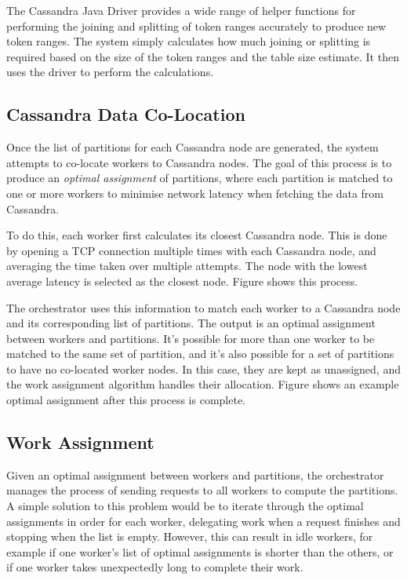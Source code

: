 
The Cassandra Java Driver provides a wide range of helper functions for performing the joining and splitting of token ranges accurately to produce new token ranges. The system simply calculates how much joining or splitting is required based on the size of the token ranges and the table size estimate. It then uses the driver to perform the calculations.

\subsection{Cassandra Data Co-Location}\label{subsec:colocation}
Once the list of partitions for each Cassandra node are generated, the system attempts to co-locate workers to Cassandra nodes. The goal of this process is to produce an \textit{optimal assignment} of partitions, where each partition is matched to one or more workers to minimise network latency when fetching the data from Cassandra.

To do this, each worker first calculates its closest Cassandra node. This is done by opening a TCP connection multiple times with each Cassandra node, and averaging the time taken over multiple attempts. The node with the lowest average latency is selected as the closest node. Figure  shows this process.


The orchestrator uses this information to match each worker to a Cassandra node and its corresponding list of partitions. The output is an optimal assignment between workers and partitions. It's possible for more than one worker to be matched to the same set of partition, and it's also possible for a set of partitions to have no co-located worker nodes. In this case, they are kept as unassigned, and the work assignment algorithm handles their allocation. Figure  shows an example optimal assignment after this process is complete.


\subsection{Work Assignment}
Given an optimal assignment between workers and partitions, the orchestrator manages the process of sending requests to all workers to compute the partitions. A simple solution to this problem would be to iterate through the optimal assignments in order for each worker, delegating work when a request finishes and stopping when the list is empty. However, this can result in idle workers, for example if one worker's list of optimal assignments is shorter than the others, or if one worker takes unexpectedly long to complete their work.

